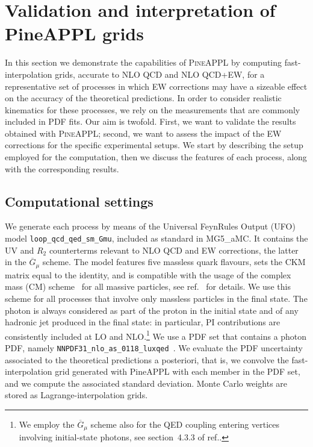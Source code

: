 \section{Validation and interpretation of PineAPPL grids}
\label{sec:results}

In this section we demonstrate the capabilities of \textsc{PineAPPL} by
computing fast-in\-ter\-po\-la\-tion grids, accurate to NLO QCD and NLO QCD+EW,
for a representative set of processes in which EW corrections may have a
sizeable effect on the accuracy of the theoretical predictions.
In order to consider realistic kinematics for these
processes, we rely on the measurements that are commonly included in PDF
fits. Our aim is twofold. First, we want to validate the results
obtained with \textsc{PineAPPL}; second, we want to assess the
impact of the EW corrections for the specific experimental setups. We start by describing the
setup employed for the computation, then we discuss the features of each process, along with
the corresponding results.

\subsection{Computational settings}
\label{subsec:computational_settings}

We generate each process by means of the Universal FeynRules Output
(UFO)~\cite{Degrande:2011ua} model {\tt loop\_qcd\_qed\_sm\_Gmu},
included as standard in {\sc MG5\_aMC}. It contains the UV and $R_2$
counterterms relevant to NLO QCD and EW corrections, the latter in the
$\overline{G}_\mu$ scheme. The model features five massless quark flavours,
sets the CKM matrix equal to the identity, and is compatible with the usage of
the complex mass (CM) scheme~\cite{Denner:1999gp,Denner:2005fg} for all massive particles, see
ref.~\cite{Frederix:2018nkq} for details. We use this scheme
for all processes that involve only massless particles in the final state.
The photon is always considered as part of the proton in the initial state and
of any hadronic jet produced in the final state: 
 in particular, PI contributions are consistently included at LO and NLO.\footnote{We employ the $\overline{G}_\mu$ scheme also for the QED coupling entering vertices involving initial-state photons, see section~4.3.3 of ref.\cite{Denner:2019vbn}.}
We use a PDF set that contains a photon PDF, namely
{\tt NNPDF31\_nlo\_as\_0118\_luxqed}~\cite{Bertone:2017bme}. We evaluate the PDF
uncertainty associated to the theoretical predictions a posteriori, that is,
we convolve the fast-interpolation grid generated with {\sc PineAPPL} with
each member in the PDF set, and we compute the associated standard deviation. Monte Carlo
weights are stored as Lagrange-interpolation grids.

